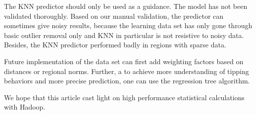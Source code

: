 \documentclass[12pt,a4paper]{article}
\begin{document}
  The KNN predictor should only be used as a guidance. The model has not been validated thoroughly. Based on our manual validation, the predictor can sometimes give noisy results, because the learning data set has only gone through basic outlier removal only and KNN in particular is not resistive to noisy data. Besides, the KNN predictor performed badly in regions with sparse data.

  Future implementation of the data set can first add weighting factors based on distances or regional norms. Further, a to achieve more understanding of tipping behaviors and more precise prediction, one can use the regression tree algorithm.

  We hope that this article cast light on high performance statistical calculations with Hadoop.
  \cleardoublepage
  \printbibliography 
  
\end{document}
